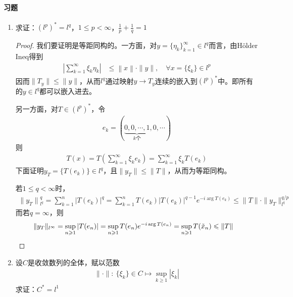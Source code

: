 \paragraph{习题}
\begin{enumerate}[leftmargin=2cm, label=\arabic*]
    \item 求证：$(l^p)^* = l^q$，$1\leqslant p<\infty$，$\frac{1}{p} + \frac{1}{q} = 1$
    \begin{proof}
        我们要证明是等距同构的。一方面，对$y = \{\eta_k\}_{k=1}^{\infty}\in l^q$而言，由Hölder Ineq得到
        \begin{align*}
            \left|\sum\limits_{k=1}^{\infty} \xi_k \eta_k \right| &\leqslant \left\|x \right\|\cdot \|y\|,\quad \forall x = \{\xi_k\}\in l^p
        \end{align*}
        因而$\|T_y\| \leqslant \|y\|$，从而$l^q$通过映射$y\to T_y$连续的嵌入到$(l^p)^*$中。即所有的$y\in l^q$都可以嵌入进去。

        另一方面，对$T\in (l^p)^*$，令
        \begin{align*}
            e_k = (\underbrace{0,0,\cdots,1}\limits_{k\text{个}},0,\cdots)
        \end{align*}
        则
        \begin{align*}
            T(x) = T\left(\sum\limits_{k=1}^{\infty}\xi_k e_k\right) = \sum\limits_{k=1}^{\infty} \xi_k T(e_k)
        \end{align*}
        下面证明$y_T = \{T(e_k)\}\in l^q$，且$\|y_T\| \leqslant \|T\|$，从而为等距同构。

        若$1\leqslant q<\infty$时，
        \begin{align*}
            \|y_T\|{}_{l^q}^q = \sum\limits_{k=1}^n |T(e_k)|^q = \sum\limits_{k=1}^n T(e_k) |T(e_k)|^{q-1} e^{-i\arg T(e_k)} \leqslant \|T\| \cdot\|y_T\|_{l^q}^{q/p} 
        \end{align*}
        而若$q = \infty$，则
        \begin{align*}
            \|y_T\|_{l^{\infty}} &= \sup\limits_{n\geqslant 1} |T(e_n)| = \sup\limits_{n\geqslant 1} T(e_n) e^{-i\arg T(e_n)} = \sup\limits_{n\geqslant 1} T(\Tilde{x}_n) \leqslant \|T\|
        \end{align*}
    \end{proof}

    \item 设$C$是收敛数列的全体，赋以范数
    \begin{align*}
        \|\cdot\|:\ \{\xi_k\}\in C\mapsto \sup\limits_{k\geqslant 1} |\xi_k|
    \end{align*}
    求证：$C^* = l^1$


\end{enumerate}
